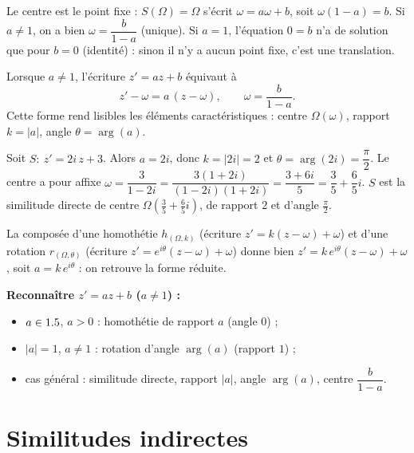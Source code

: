 \begin{remarque}
Le centre est le point fixe : $S(\Omega)=\Omega$ s'écrit $\omega=a\omega+b$, soit $\omega(1-a)=b$.
Si $a\neq1$, on a bien $\omega=\dfrac{b}{1-a}$ (unique). Si $a=1$, l'équation $0=b$ n'a de
solution que pour $b=0$ (identité) : sinon il n'y a aucun point fixe, c'est une translation.
\end{remarque}

\begin{propriete}
Lorsque $a\neq1$, l'écriture $z'=az+b$ équivaut à
\[
z'-\omega=a\,(z-\omega),\qquad \omega=\frac{b}{1-a}.
\]
Cette forme rend lisibles les éléments caractéristiques : centre $\Omega(\omega)$, rapport $k=|a|$, angle $\theta=\arg(a)$.
\end{propriete}

\begin{exemple}
Soit $S:\ z'=2i\,z+3$. Alors $a=2i$, donc $k=|2i|=2$ et $\theta=\arg(2i)=\dfrac\pi2$. Le centre a pour affixe
$\omega=\dfrac{3}{1-2i}=\dfrac{3(1+2i)}{(1-2i)(1+2i)}=\dfrac{3+6i}{5}=\dfrac35+\dfrac65 i$.
$S$ est la similitude directe de centre $\Omega\!\left(\frac35+\frac65 i\right)$, de rapport $2$ et d'angle $\frac\pi2$.
\end{exemple}

\begin{remarque}
La composée d'une homothétie $h_{(\Omega,k)}$ (écriture $z'=k(z-\omega)+\omega$) et d'une rotation
$r_{(\Omega,\theta)}$ (écriture $z'=e^{i\theta}(z-\omega)+\omega$) donne bien
$z'=k\,e^{i\theta}(z-\omega)+\omega$, soit $a=k\,e^{i\theta}$ : on retrouve la forme réduite.
\end{remarque}

\begin{aretenir}
\textbf{Reconnaître $z'=az+b$ ($a\neq1$) :}
\begin{itemize}
\item $a\in1.5$, $a>0$ : homothétie de rapport $a$ (angle $0$) ;
\item $|a|=1$, $a\neq1$ : rotation d'angle $\arg(a)$ (rapport $1$) ;
\item cas général : similitude directe, rapport $|a|$, angle $\arg(a)$, centre $\dfrac{b}{1-a}$.
\end{itemize}
\end{aretenir}

\section{Similitudes indirectes}

